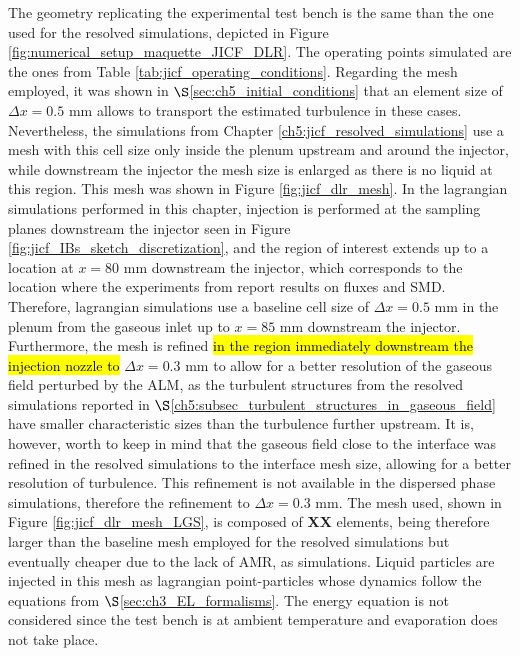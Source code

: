 The geometry replicating the experimental test bench is the same than the one used for the resolved simulations, depicted in Figure \ref{fig:numerical_setup_maquette_JICF_DLR}. The operating points simulated are the ones from Table \ref{tab:jicf_operating_conditions}. Regarding the mesh employed, it was shown in $\S$\ref{sec:ch5_initial_conditions} that an element size of $\Delta x = 0.5$ mm allows to transport the estimated turbulence in these cases. Nevertheless, the simulations from Chapter \ref{ch5:jicf_resolved_simulations} use a mesh with this cell size only inside the plenum upstream and around the injector, while downstream the injector the mesh size is enlarged as there is no liquid at this region. This mesh was shown in Figure \ref{fig:jicf_dlr_mesh}. In the lagrangian simulations performed in this chapter, injection is performed at the sampling planes downstream the injector seen in Figure \ref{fig:jicf_IBs_sketch_discretization}, and the region of interest extends up to a location at $x = 80$ mm downstream the injector, which corresponds to the location where the experiments from  report results on fluxes and SMD. Therefore, lagrangian simulations use a baseline cell size of $\Delta x = 0.5$ mm in the plenum from the gaseous inlet up to $x = 85$ mm downstream the injector. Furthermore, the mesh is refined \hl{in the region immediately downstream the injection nozzle to} $\Delta x = 0.3$ mm to allow for a better resolution of the gaseous field perturbed by the ALM, as the turbulent structures from the resolved simulations reported in $\S$\ref{ch5:subsec_turbulent_structures_in_gaseous_field} have smaller characteristic sizes than the turbulence further upstream. It is, however, worth to keep in mind that the gaseous field close to the interface was refined in the resolved simulations to the interface mesh size, allowing for a better resolution of turbulence. This refinement is not available in the dispersed phase simulations, therefore the refinement to $\Delta x = 0.3$ mm. The mesh used, shown in Figure \ref{fig:jicf_dlr_mesh_LGS}, is composed of \textbf{XX} elements, being therefore larger than the baseline mesh employed for the resolved simulations but eventually cheaper due to the lack of AMR, as simulations. Liquid particles are injected in this mesh as lagrangian point-particles whose dynamics follow the equations from  $\S$\ref{sec:ch3_EL_formalisms}. The energy equation is not considered since the test bench is at ambient temperature and evaporation does not take place.

